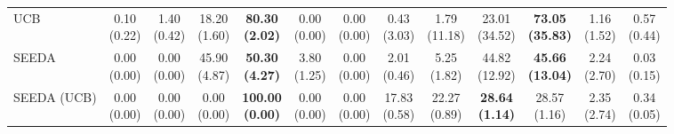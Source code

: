 \begin{table}[H]
{\begin{tabular}{l|cccccc|cccccc}
UCB & \makecell{0.10 \\ (0.22)} & \makecell{1.40 \\ (0.42)} & {\cellcolor[HTML]{C8E6C9}} \makecell{18.20 \\ (1.60)} & \bfseries \makecell{80.30 \\ (2.02)} & \makecell{0.00 \\ (0.00)} & \makecell{0.00 \\ (0.00)} & \makecell{0.43 \\ (3.03)} & \makecell{1.79 \\ (11.18)} & {\cellcolor[HTML]{C8E6C9}} \makecell{23.01 \\ (34.52)} & \bfseries \makecell{73.05 \\ (35.83)} & \makecell{1.16 \\ (1.52)} & \makecell{0.57 \\ (0.44)} \\
SEEDA & \makecell{0.00 \\ (0.00)} & \makecell{0.00 \\ (0.00)} & {\cellcolor[HTML]{C8E6C9}} \makecell{45.90 \\ (4.87)} & \bfseries \makecell{50.30 \\ (4.27)} & \makecell{3.80 \\ (1.25)} & \makecell{0.00 \\ (0.00)} & \makecell{2.01 \\ (0.46)} & \makecell{5.25 \\ (1.82)} & {\cellcolor[HTML]{C8E6C9}} \makecell{44.82 \\ (12.92)} & \bfseries \makecell{45.66 \\ (13.04)} & \makecell{2.24 \\ (2.70)} & \makecell{0.03 \\ (0.15)} \\
SEEDA (UCB) & \makecell{0.00 \\ (0.00)} & \makecell{0.00 \\ (0.00)} & {\cellcolor[HTML]{C8E6C9}} \makecell{0.00 \\ (0.00)} & \bfseries \makecell{100.00 \\ (0.00)} & \makecell{0.00 \\ (0.00)} & \makecell{0.00 \\ (0.00)} & \makecell{17.83 \\ (0.58)} & \makecell{22.27 \\ (0.89)} & {\cellcolor[HTML]{C8E6C9}} \bfseries \makecell{28.64 \\ (1.14)} & \makecell{28.57 \\ (1.16)} & \makecell{2.35 \\ (2.74)} & \makecell{0.34 \\ (0.05)} \\

\end{tabular}}
\end{table}
